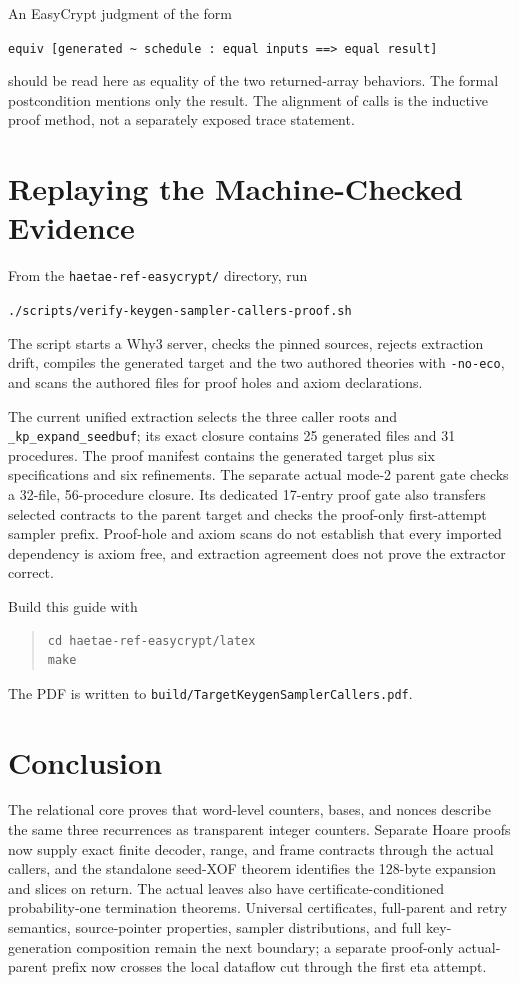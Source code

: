 \documentclass[11pt]{article}
\theoremstyle{definition}
\theoremstyle{plain}
\theoremstyle{remark}
\newcommand{\code}[1]{\nolinkurl{#1}}
\begin{document}
An EasyCrypt judgment of the form
\begin{center}
\code{equiv [generated ~ schedule : equal inputs ==> equal result]}
\end{center}
should be read here as equality of the two returned-array behaviors.  The
formal postcondition mentions only the result.  The alignment of calls is the
inductive proof method, not a separately exposed trace statement.

\section{Replaying the Machine-Checked Evidence}

From the \code{haetae-ref-easycrypt/} directory, run
\begin{center}
\code{./scripts/verify-keygen-sampler-callers-proof.sh}
\end{center}
The script starts a Why3 server, checks the pinned sources, rejects extraction
drift, compiles the generated target and the two authored theories with
\code{-no-eco}, and scans the authored files for proof holes and axiom
declarations.

The current unified extraction selects the three caller roots and
\code{_kp_expand_seedbuf}; its exact closure contains 25 generated files and
31 procedures.  The proof manifest contains the generated target plus six
specifications and six refinements.  The separate actual mode-2 parent gate
checks a 32-file, 56-procedure closure.  Its dedicated 17-entry proof gate
also transfers selected contracts to the parent target and checks the
proof-only first-attempt sampler prefix.  Proof-hole and axiom scans do not
establish that every imported dependency is axiom free, and extraction
agreement does not prove the extractor correct.

Build this guide with
\begin{quote}
\begin{verbatim}
cd haetae-ref-easycrypt/latex
make
\end{verbatim}
\end{quote}
The PDF is written to
\code{build/TargetKeygenSamplerCallers.pdf}.

\section*{Conclusion}

The relational core proves that word-level counters, bases, and nonces describe
the same three recurrences as transparent integer counters.  Separate Hoare
proofs now supply exact finite decoder, range, and frame contracts through the
actual callers, and the standalone seed-XOF theorem identifies the 128-byte
expansion and slices on return.  The actual leaves also have
certificate-conditioned probability-one termination theorems.  Universal
certificates, full-parent and retry semantics, source-pointer properties,
sampler distributions, and full key-generation composition remain the next
boundary; a separate proof-only actual-parent prefix now crosses the local
dataflow cut through the first eta attempt.
\end{document}
